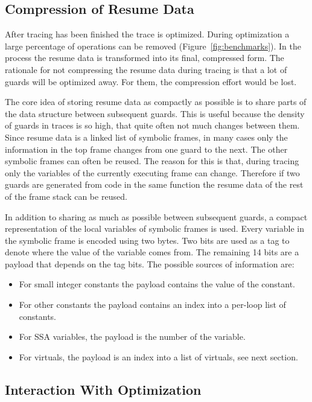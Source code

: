 \documentclass[10pt,preprint]{sigplanconf}
\begin{document}
\subsection{Compression of Resume Data}
\label{sub:compression}

After tracing has been finished the trace is optimized.
During optimization a large percentage of operations can be removed (Figure~\ref{fig:benchmarks}).
In the process the resume data is transformed into its final, compressed form.
The rationale for not compressing the resume data during tracing
is that a lot of guards will be optimized away.
For them, the compression effort would be lost.

The core idea of storing resume data as compactly as possible
is to share parts of the data structure between subsequent guards.
This is useful because the density of guards in traces is so high,
that quite often not much changes between them.
Since resume data is a linked list of symbolic frames,
in many cases only the information in the top frame changes from one guard to the next.
The other symbolic frames can often be reused.
The reason for this is that, during tracing only the variables
of the currently executing frame can change.
Therefore if two guards are generated from code in the same function
the resume data of the rest of the frame stack can be reused.

In addition to sharing as much as possible between subsequent guards,
a compact representation of the local variables of symbolic frames is used.
Every variable in the symbolic frame is encoded using two bytes.
Two bits are used as a tag to denote where the value of the variable
comes from.
The remaining 14 bits are a payload that depends on the tag bits.
The possible sources of information are:

\begin{itemize}
    \item For small integer constants
        the payload contains the value of the constant.
    \item For other constants
        the payload contains an index into a per-loop list of constants.
    \item For SSA variables,
        the payload is the number of the variable.
    \item For virtuals,
        the payload is an index into a list of virtuals, see next section.
\end{itemize}

\subsection{Interaction With Optimization}
\label{sub:optimization}
\end{document}
